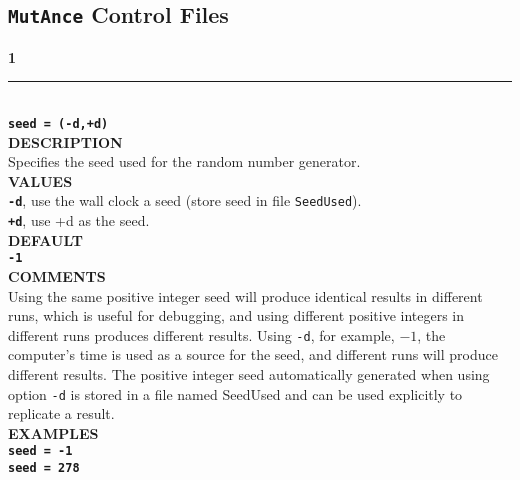 \documentclass[11pt]{article}
\begin{document}
\subsection{\texttt{MutAnce} Control Files}
\noindent\textbf{{\large 1}} \\
\noindent\rule{\textwidth}{0.8pt} \\
\textbf{{\Large \texttt{seed = (-d,+d)}}} \vspace{5pt}\\
\textbf{DESCRIPTION} \vspace{5pt}\\
Specifies the seed used for the random number generator.\vspace{5pt}\\
\textbf{VALUES} \vspace{5pt}\\
\textbf{\texttt{-d}}, use the wall clock a seed (store seed in file \texttt{SeedUsed}).\vspace{5pt}\\
\textbf{\texttt{+d}}, use +d as the seed.\vspace{10pt}\\
\textbf{DEFAULT} \vspace{5pt}\\
\textbf{\texttt{-1}} \vspace{5pt}\\
\textbf{COMMENTS} \vspace{5pt}\\
Using the same positive integer seed will produce identical results in
different runs, which is useful for debugging, and using different
positive integers in different runs produces different results.  Using
\texttt{-d}, for example, $-1$, the computer's time is used as a source for the seed, and
different runs will produce different results. 
The positive integer seed automatically generated when using option \texttt{-d} is stored in a file named SeedUsed and can be used explicitly to replicate a result. 
 \vspace{5pt}\\
\textbf{EXAMPLES} \vspace{5pt}\\
\textbf{\texttt{seed = -1}}\vspace{5pt}\\
\textbf{\texttt{seed = 278}}\vspace{10pt}\\
\end{document}
